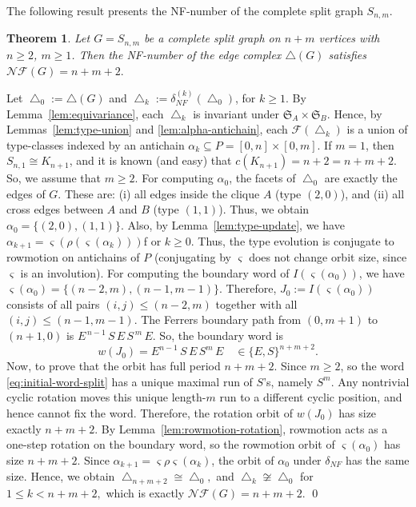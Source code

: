 \documentclass[12pt]{article}
\renewenvironment{proof}{{\noindent\bfseries Proof.}}{\qed}
\theoremstyle{plain}
\newtheorem{theorem}{Theorem}[section]
\theoremstyle{definition}
\begin{document}
	\medskip
	The following result presents the NF-number of the complete split graph $S_{n,m}.$
	 \begin{theorem}\label{thm:NFnumber-split}
		Let $G=S_{n,m}$ be a complete split graph on $n+m$ vertices with $n\ge 2$, $m\ge 1$.
		Then the NF-number of the edge complex $\bigtriangleup(G)$ satisfies
		 $\mathcal{NF}(G)=n+m+2.$ 
	\end{theorem}
	
	\begin{proof}
		Let $\bigtriangleup_0:=\bigtriangleup(G)$ and $\bigtriangleup_{k}:=\delta_{NF}^{(k)}(\bigtriangleup_0)$, for $k\ge 1$. 	By Lemma~\ref{lem:equivariance}, each $\bigtriangleup_k$ is invariant under $\mathfrak{S}_A\times\mathfrak{S}_B$.
		Hence, by Lemmas~\ref{lem:type-union} and \ref{lem:alpha-antichain}, each $\mathcal{F}(\bigtriangleup_k)$ is a union
		of type-classes indexed by an antichain $\alpha_k\subseteq P=[0,n]\times[0,m]$.
		 If $m=1$, then $S_{n,1}\cong K_{n+1}$, and it is known (and easy) that $c(K_{n+1})=n+2=n+m+2$.
		So, we  assume that $m\ge 2$. For computing $\alpha_0$,  the facets of $\bigtriangleup_0$ are exactly the edges of $G$.
		These are:
		(i) all edges inside the clique $A$ (type $(2,0)$), and
		(ii) all cross edges between $A$ and $B$ (type $(1,1)$).
		Thus, we obtain $\alpha_0=\{(2,0),(1,1)\}.$ 
		Also, by Lemma~\ref{lem:type-update}, we have $\alpha_{k+1}=\varsigma(\rho(\varsigma(\alpha_k)))$f or $k\ge 0.$
		 Thus, the type evolution is conjugate to rowmotion on antichains of $P$ (conjugating by $\varsigma$ does not
		change orbit size, since $\varsigma$ is an involution). For computing the boundary word of $I(\varsigma(\alpha_0))$, we have
		 $\varsigma(\alpha_0)=\{(n-2,m),(n-1,m-1)\}.$ Therefore, $J_0:=I(\varsigma(\alpha_0))$ consists of all pairs $(i,j)\le(n-2,m)$ together with all $(i,j)\le(n-1,m-1)$.
		The Ferrers boundary path from $(0,m+1)$ to $(n+1,0)$ is  $E^{\,n-1}\,S\,E\,S^{\,m}\,E.$ 
		So, the boundary word is
		\begin{equation}\label{eq:initial-word-split}
			w(J_0)=E^{n-1}\,S\,E\,S^{m}\,E
			\quad\in\{E,S\}^{n+m+2}.
		\end{equation}
		Now, to prove that the orbit has full period $n+m+2$. Since $m\ge 2$, so the word \eqref{eq:initial-word-split} has a unique maximal run of $S$'s, namely $S^m$.
		Any nontrivial cyclic rotation moves this unique length-$m$ run to a different cyclic position, and hence
		cannot fix the word. Therefore, the rotation orbit of $w(J_0)$ has size exactly $n+m+2$. By Lemma~\ref{lem:rowmotion-rotation}, rowmotion acts as a one-step rotation on the boundary word,
		so the rowmotion orbit of $\varsigma(\alpha_0)$ has size $n+m+2$. Since $\alpha_{k+1}=\varsigma\rho\varsigma(\alpha_k)$,
		the orbit of $\alpha_0$ under $\delta_{NF}$ has the same size. Hence, we obtain
		 $\bigtriangleup_{n+m+2}\cong \bigtriangleup_0,$ and  $\bigtriangleup_k\not\cong \bigtriangleup_0$ for $1\le k<n+m+2,$ 		which is exactly $\mathcal{NF}(G)=n+m+2$.
	\end{proof}
	
\end{document}
